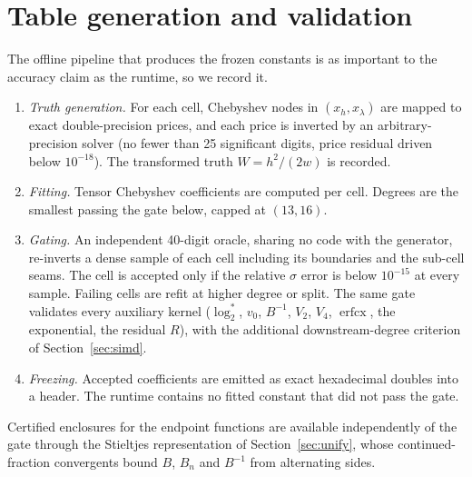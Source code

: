 \documentclass[11pt]{article}
\newcommand{\erfcx}{\operatorname{erfcx}}
\begin{document}
\section{Table generation and validation}
\label{app:generation}

The offline pipeline that produces the frozen constants is as important to the accuracy claim as the runtime, so we record it.

\begin{enumerate}[leftmargin=2em,itemsep=1pt]
\item \emph{Truth generation.} For each cell, Chebyshev nodes in $(x_h,x_\lambda)$ are mapped to exact double-precision prices, and each price is inverted by an arbitrary-precision solver (no fewer than 25 significant digits, price residual driven below $10^{-18}$). The transformed truth $W=h^2/(2w)$ is recorded. \item \emph{Fitting.} Tensor Chebyshev coefficients are computed per cell. Degrees are the smallest passing the gate below, capped at $(13,16)$. \item \emph{Gating.} An independent 40-digit oracle, sharing no code with the generator, re-inverts a dense sample of each cell including its boundaries and the sub-cell seams. The cell is accepted only if the relative $\sigma$ error is below $10^{-15}$ at every sample. Failing cells are refit at higher degree or split. The same gate validates every auxiliary kernel ($\log_2^{*}$, $v_0$, $B^{-1}$, $V_2$, $V_4$, $\erfcx$, the exponential, the residual $R$), with the additional downstream-degree criterion of Section~\ref{sec:simd}. \item \emph{Freezing.} Accepted coefficients are emitted as exact hexadecimal doubles into a header. The runtime contains no fitted constant that did not pass the gate.
\end{enumerate}

Certified enclosures for the endpoint functions are available independently of the gate through the Stieltjes representation of Section~\ref{sec:unify}, whose continued-fraction convergents bound $B$, $B_n$ and $B^{-1}$ from alternating sides.
\end{document}
